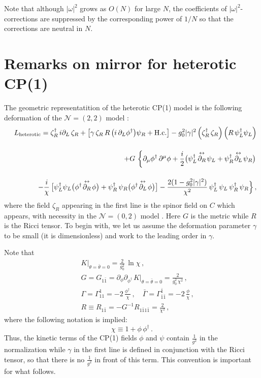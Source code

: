\documentclass[epsfig,12pt]{article}
\def\beq{\begin{equation}}
\def\eeq{\end{equation}}
\def\beqn{\begin{eqnarray}}
\def\eeqn{\end{eqnarray}}
\def\beqn{\begin{eqnarray}}
\def\eeqn{\end{eqnarray}}
\def\beq{\begin{equation}}
\def\eeq{\end{equation}}
\begin{document}
	Note that although $ |\omega|^2 $ grows as $ O(N) $ for large $N$, the coefficients of 
	$|\omega|^2$-corrections are suppressed by the corresponding power of $ 1/N $ so that 
	the corrections are neutral in $ N $.




\newpage

\section{Remarks on mirror for heterotic CP(1) }



The geometric representatition of  the heterotic CP(1) model is the following deformation
of the ${\mathcal N}=(2,2)$ model \cite{SY1}:
\beqn
&&
L_{{\rm heterotic}}= 
\zeta_R^\dagger \, i\partial_L \, \zeta_R  + 
\left[\gamma \, \zeta_R  \,R\,  \big( i\,\partial_{L}\phi^{\dagger} \big)\psi_R
+{\rm H.c.}\right] -g_0^2|\gamma |^2 \left(\zeta_R^\dagger\, \zeta_R
\right)\left(R\,  \psi_L^\dagger\psi_L\right)
\nonumber
\\[4mm]
&&
+
G\, \left\{\rule{0mm}{5mm}
\partial_\mu \phi^\dagger\, \partial^\mu\phi  
+\frac{i}{2}\big(\psi_L^\dagger\!\stackrel{\leftrightarrow}{\partial_R}\!\psi_L 
+ \psi_R^\dagger\!\stackrel{\leftrightarrow}{\partial_L}\!\psi_R
\big)\right.
\nonumber
\\[4mm] 
&&
-\frac{i}{\chi}\,  \big[\psi_L^\dagger \psi_L
\big(\phi^\dagger \!\stackrel{\leftrightarrow}{\partial_R}\!\phi
\big)+ \psi_R^\dagger\, \psi_R
\big(\phi^\dagger\!\stackrel{\leftrightarrow}{\partial_L}\!\phi
\big)
\big]
-
\frac{2(1- g_0^2 |\gamma |^2)}{\chi^2}\,\psi_L^\dagger\,\psi_L \,\psi_R^\dagger\,\psi_R
\Big\}\,,
\label{AAone}
\eeqn
where the field $\zeta_R$ appearing in the first line is
the spinor field on $C$ which appears, with necessity in the ${\mathcal N}=(0,2)$ model \cite{EdTo}.
Here $G$ is the metric while $R$ is the Ricci tensor.
To begin with, we let us assume the deformation parameter $\gamma$ to be small (it is dimensionless)
and work to the leading order in $\gamma$.

Note that 
\beqn
&&
K\big|_{\theta=\bar\theta=0}=\frac{2}{g_{0}^{2}}\,\ln \chi\,, 
\nonumber
\\[2mm]
&&
G=G_{1\bar 1}=\partial_\phi\partial_{\phi^\dagger\,} 
K\big|_{\theta=\bar\theta=0}=
\frac{2}{g_{0}^2\,\chi^{2}}\,,
\nonumber
\\[2mm]
&&
\Gamma =\Gamma^{1}_{11} =- 2\, \frac{\phi^\dagger\,}{\chi}\,,\quad 
\bar\Gamma =\Gamma^{\bar 1}_{\bar 1\bar 1}=
- 2\, \frac{ \phi}{\chi}\,,
\nonumber
\\[2mm]
&&
 R \equiv  R_{1\bar 1}=-G^{-1}\!R_{1\bar 1 1\bar 1}=\frac{2}{\chi^2}\,,
\label{Atwo}
\eeqn
where the following notation
is implied:
\beq
\chi \equiv 1+\phi\,\phi^\dagger\,.
\eeq
Thus, the kinetic terms of the CP(1) fields $\phi$ and $\psi$ contain $\frac{1}{g^2}$ in the normalization
while $\gamma$ in the first line is defined in conjunction with the Ricci tensor, so that there is no $\frac{1}{g^2}$
in front of this term. This convention is important for what follows.
\end{document}
